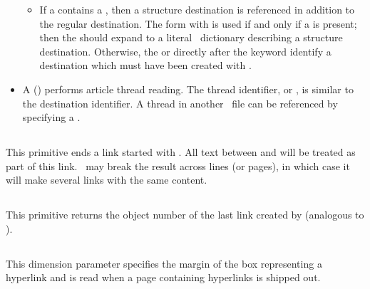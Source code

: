 \documentclass{pdftexmanual}
\begin{document}
\begin{itemize}
\begin{itemize}
\item If a  contains a
, then a structure destination is
referenced in addition to the regular destination. The form with
 is used if and only if a 
is present; then the  should expand to a literal
\PDF\ dictionary describing a structure destination. Otherwise, the
 or  directly after the
 keyword identify a destination which must have been
created with  \unskip.

\end{itemize}

\item A  () performs
article thread reading. The thread identifier,  or
, is similar to the destination identifier. A thread
in another \PDF\ file can be referenced by specifying a .

\end{itemize}

\subsection{}

This primitive ends a link started with . All text
between  and  will be treated as part
of this link. \PDFTEX\ may break the result across lines (or pages), in which
case it will make several links with the same content.

\subsection{}

This primitive returns the object number of the last link created by
 (analogous to ).

\subsection{}

This dimension parameter specifies the margin of the box representing
a hyperlink and is read when a page containing hyperlinks is shipped out.
\end{document}

